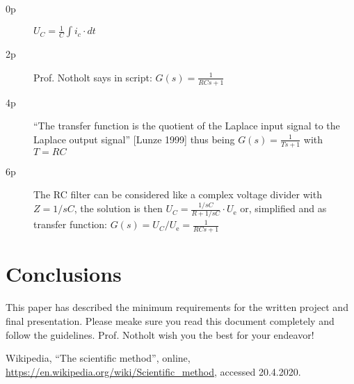 \documentclass[a4paper, 10pt]{IEEEtran}
\begin{document}
	\begin{description}
		\item[0p] $U_{C} = \frac{1}{C}\int i_{c} \cdot dt$
		\item[2p] Prof. Notholt says in script: $G(s) = \frac{1}{RCs+1}$
		\item[4p] ``The transfer function is the quotient of the Laplace input signal to the Laplace output signal'' [Lunze 1999] thus being $G(s) = \frac{1}{Ts+1}$ with $T=RC$
		\item[6p] The RC filter can be considered like a complex voltage divider with $Z = 1/sC$, the solution is then $U_{C} = \frac{1/sC}{R + 1/sC} \cdot U_\textrm{e}$ or, simplified and as transfer function: $G(s) = U_{C}/U_\textrm{e} = \frac{1}{RCs + 1}$ 
	\end{description}
	
	
	\section{Conclusions}
	
	This paper has described the minimum requirements for the written project and final presentation. Please meake sure you read this document completely and follow the guidelines. Prof. Notholt wish you the best for your endeavor!

	\begin{thebibliography}{1em}
		 Wikipedia, ``The scientific method'', online, \url{https://en.wikipedia.org/wiki/Scientific_method}, accessed 20.4.2020.
	\end{thebibliography}
	
\end{document}
